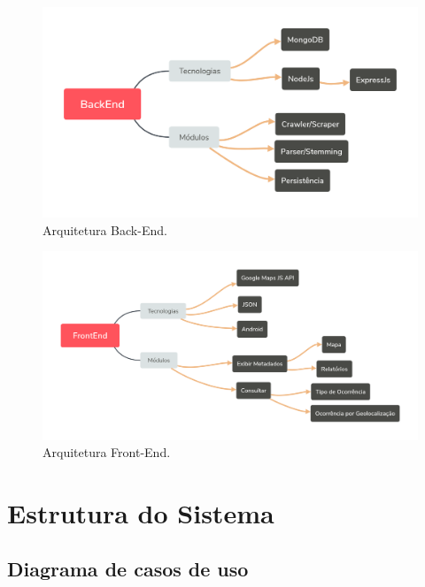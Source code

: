 \documentclass[
	12pt,				%
	openright,			%
	twoside,			%
	a4paper,			%
	english,			%
	french,				%
	spanish,			%
	brazil,				%
	]{abntex2}
\begin{document}
\begin{figure}[h]
	\caption{\label{backend_figura}Arquitetura Back-End.}
	\begin{center}
		\includegraphics[scale=0.4	]{figuras/arquitetura-backend.png}
	\end{center}
\end{figure}


\begin{figure}[h]
	\caption{\label{frontend_figura}Arquitetura Front-End.}
	\begin{center}
		\includegraphics[scale=0.3]{figuras/arquitetura-frontend.png}
	\end{center}
\end{figure}

\chapter{Estrutura do Sistema}

\section{Diagrama de casos de uso}
\end{document}
